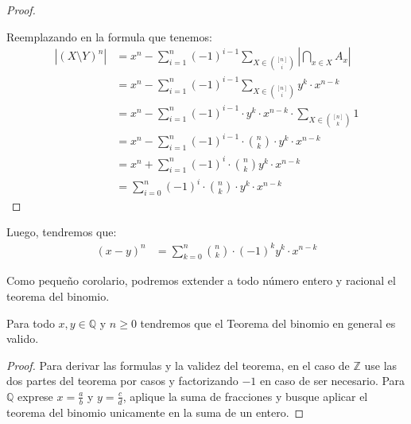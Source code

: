 \documentclass[12pt,a4paper,oneside]{memoir}
\begin{document}
\begin{proof}
\begin{itemize}
    \end{itemize}
    Reemplazando en la formula que tenemos:
    \begin{align*}
        |(X\setminus Y)^n| &= x^n - \sum_{i = 1}^n (-1)^{i-1} \sum_{X \in \binom{[n]}{i}} \left|\bigcap_{x \in X} A_x\right| \\
        &= x^n - \sum_{i = 1}^n (-1)^{i-1} \sum_{X \in \binom{[n]}{i}} y^k \cdot x^{n-k}\\
        &= x^n - \sum_{i = 1}^n (-1)^{i-1} \cdot y^k \cdot x^{n-k} \cdot \sum_{X \in \binom{[n]}{k}} 1\\
        &= x^n - \sum_{i = 1}^n (-1)^{i-1}\cdot \binom{n}{k} \cdot y^k \cdot x^{n-k}\\
        &= x^n + \sum_{i = 1}^n (-1)^i \cdot \binom{n}{k} y^k \cdot x^{n-k}\\
        &= \sum_{i = 0}^n (-1)^i \cdot \binom{n}{k} \cdot y^k \cdot x^{n-k}
    \end{align*}
\end{proof}
Luego, tendremos que:
\begin{align*}
    (x-y)^n &= \sum_{k = 0}^n \binom{n}{k} \cdot (-1)^k y^k \cdot x^{n-k}
\end{align*}

Como pequeño corolario, podremos extender a todo número entero y racional el teorema del binomio.
\begin{corollary}
    Para todo $x, y \in \mathbb{Q}$ y $n \ge 0$ tendremos que el Teorema del binomio en general es valido.
\end{corollary}
\begin{proof}
    Para derivar las formulas y la validez del teorema, en el caso de $\mathbb{Z}$ use las dos partes del teorema por casos y factorizando $-1$ en caso de ser necesario. Para $\mathbb{Q}$ exprese $x = \frac{a}{b}$ y $y = \frac{c}{d}$, aplique la suma de fracciones y busque aplicar el teorema del binomio unicamente en la suma de un entero.
\end{proof}
\end{document}
